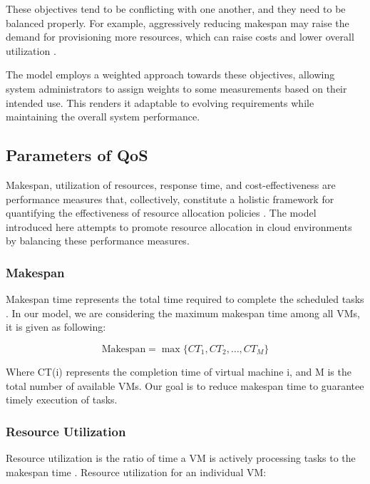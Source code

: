 \documentclass[pdflatex,sn-mathphys-num]{sn-jnl}%
\theoremstyle{thmstyleone}%
\theoremstyle{thmstyletwo}%
\theoremstyle{thmstylethree}%
\begin{document}
These objectives tend to be conflicting with one another, and they need to be balanced properly. For example, aggressively reducing makespan may raise the demand for provisioning more resources, which can raise costs and lower overall utilization \cite{bib9}.

The model employs a weighted approach towards these objectives, allowing system administrators to assign weights to some measurements based on their intended use. This renders it adaptable to evolving requirements while maintaining the overall system performance.

\subsection{Parameters of QoS}\label{subsec3.2}

Makespan, utilization of resources, response time, and cost-effectiveness are performance measures that, collectively, constitute a holistic framework for quantifying the effectiveness of resource allocation policies \cite{bib12}. The model introduced here attempts to promote resource allocation in cloud environments by balancing these performance measures.

\subsubsection{Makespan}\label{subsubsec3.2.1}
Makespan time represents the total time required to complete the scheduled tasks \cite{bib9}. In our model, we are considering the maximum makespan time among all VMs, it is given as following:

\begin{equation} \label{eq3}
\text{Makespan} = \max\{CT_1, CT_2, \dots, CT_M\}
\end{equation}%

Where CT(i) represents the completion time of virtual machine i, and M is the total number of available VMs. Our goal is to reduce makespan time to guarantee timely execution of tasks.

\subsubsection{Resource Utilization}\label{subsubsec3.2.2}
Resource utilization is the ratio of time a VM is actively processing tasks to the makespan time \cite{bib9}. Resource utilization for an individual VM:
\end{document}
